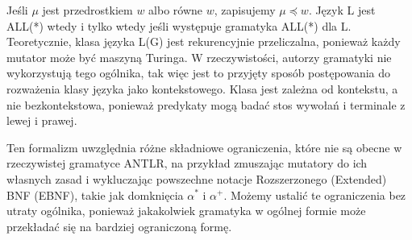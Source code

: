 Jeśli \(\mu\) jest przedrostkiem \(w\) albo równe \(w\), zapisujemy \(\mu \preceq w\).
Język L jest ALL(*) wtedy i tylko wtedy jeśli występuje gramatyka ALL(*) dla L.
Teoretycznie, klasa języka L(G) jest rekurencyjnie przeliczalna,
ponieważ każdy mutator może być maszyną Turinga.
W rzeczywistości, autorzy gramatyki nie wykorzystują tego ogólnika,
tak więc jest to przyjęty sposób postępowania do rozważenia klasy języka jako kontekstowego.
Klasa jest zależna od kontekstu, a nie bezkontekstowa,
ponieważ predykaty mogą badać stos wywołań i terminale z lewej i prawej.
\par
Ten formalizm uwzględnia różne składniowe ograniczenia, które nie są obecne w rzeczywistej
gramatyce ANTLR, na przykład zmuszając mutatory do ich własnych zasad i wykluczając
powszechne notacje Rozszerzonego (Extended) BNF (EBNF),
takie jak domknięcia \(\alpha^*\) i \(\alpha^+\).
Możemy ustalić te ograniczenia bez utraty ogólnika, ponieważ jakakolwiek
gramatyka w ogólnej formie może przekładać się na bardziej ograniczoną formę. 
